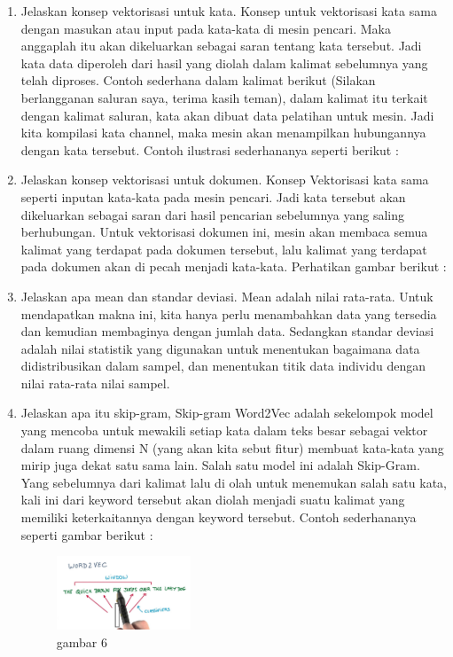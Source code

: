 \begin{enumerate}
	\item Jelaskan konsep vektorisasi untuk kata.
	\hfill\break
	Konsep untuk vektorisasi kata sama dengan masukan atau input pada kata-kata di mesin pencari. Maka anggaplah itu akan dikeluarkan sebagai saran tentang kata tersebut. Jadi kata data diperoleh dari hasil yang diolah dalam kalimat sebelumnya yang telah diproses. Contoh sederhana dalam kalimat berikut (Silakan berlangganan saluran saya, terima kasih teman), dalam kalimat itu terkait dengan kalimat saluran, kata akan dibuat data pelatihan untuk mesin. Jadi kita kompilasi kata channel, maka mesin akan menampilkan hubungannya dengan kata tersebut. Contoh ilustrasi sederhananya seperti berikut :


	\item Jelaskan konsep vektorisasi untuk dokumen.
	\hfill\break
	Konsep Vektorisasi kata sama seperti inputan kata-kata pada mesin pencari. Jadi kata tersebut akan dikeluarkan sebagai saran dari hasil pencarian sebelumnya yang saling berhubungan. Untuk vektorisasi dokumen ini, mesin akan membaca semua kalimat yang terdapat pada dokumen tersebut, lalu kalimat yang terdapat pada dokumen akan di pecah menjadi kata-kata. Perhatikan gambar berikut : 


	\item Jelaskan apa mean dan standar deviasi.
	\hfill\break
	Mean adalah nilai rata-rata. Untuk mendapatkan makna ini, kita hanya perlu menambahkan data yang tersedia dan kemudian membaginya dengan jumlah data. Sedangkan standar deviasi adalah nilai statistik yang digunakan untuk menentukan bagaimana data didistribusikan dalam sampel, dan menentukan titik data individu dengan nilai rata-rata nilai sampel.

	\item Jelaskan apa itu skip-gram,
	\hfill\break
	Skip-gram 
Word2Vec adalah sekelompok model yang mencoba untuk mewakili setiap kata dalam teks besar sebagai vektor dalam ruang dimensi N (yang akan kita sebut fitur) membuat kata-kata yang mirip juga dekat satu sama lain. Salah satu model ini adalah Skip-Gram. Yang sebelumnya dari kalimat lalu di olah untuk menemukan salah satu kata, kali ini dari keyword tersebut akan diolah menjadi suatu kalimat yang memiliki keterkaitannya dengan keyword tersebut. Contoh sederhananya seperti gambar berikut : 

	\begin{figure}[H]
	\centering
		\includegraphics[width=4cm]{figures/1174080/5/t6.PNG}
		\caption{gambar 6}
	\end{figure}
\end{enumerate}



